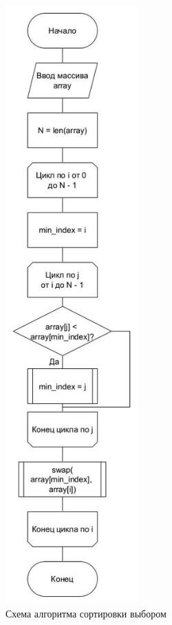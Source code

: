 \begin{figure}[hp]
	\begin{center}
		\includegraphics[height=23cm]{graph/select.jpg}
	\end{center}
	\caption{Схема алгоритма сортировки выбором}
\end{figure}

